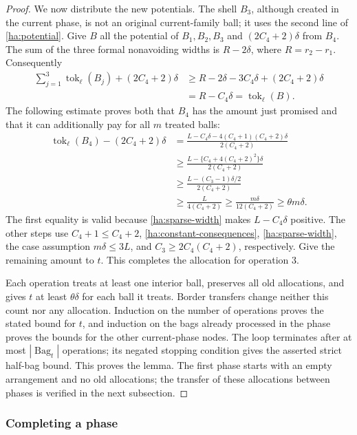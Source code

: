 \documentclass[11pt]{amsart}
\theoremstyle{definition}
\theoremstyle{remark}
\numberwithin{equation}{section}
\begin{document}
\begin{proof}
We now distribute the new potentials.  The shell $B_3$, although
created in the current phase, is not an original current-family ball;
it uses the second line of \eqref{ha:potential}.  Give $B$ all the
potential of $B_1,B_2,B_3$ and $(2C_4+2)\delta$ from $B_4$.
The sum of the three formal nonavoiding widths is $R-2\delta$,
where $R=r_2-r_1$.  Consequently
\begin{align*}
 \sum_{j=1}^3\operatorname{tok}_\ell(B_j)+(2C_4+2)\delta
 &\geq R-2\delta-3C_4\delta+(2C_4+2)\delta\\
 &=R-C_4\delta=\operatorname{tok}_\ell(B).
\end{align*}
The following estimate proves both that $B_4$ has the amount just
promised and that it can additionally pay for all $m$ treated balls:
\begin{align*}
 \operatorname{tok}_\ell(B_4)-(2C_4+2)\delta
 &=\frac{L-C_4\delta-4(C_4+1)(C_4+2)\delta}{2(C_4+2)}\\
 &\geq\frac{L-\{C_4+4(C_4+2)^2\}\delta}{2(C_4+2)}\\
 &\geq\frac{L-(C_3-1)\delta/2}{2(C_4+2)}\\
 &\geq\frac{L}{4(C_4+2)}
 \geq\frac{m\delta}{12(C_4+2)}
 \geq\theta m\delta.
\end{align*}
The first equality is valid because \eqref{ha:sparse-width} makes
$L-C_4\delta$ positive.  The other steps use
$C_4+1\leq C_4+2$, \eqref{ha:constant-consequences},
\eqref{ha:sparse-width}, the case assumption $m\delta\leq3L$, and
$C_3\geq2C_4(C_4+2)$, respectively.  Give the remaining amount to $t$.
This completes the allocation for operation 3.

Each operation treats at least one interior ball, preserves all old
allocations, and gives $t$ at least $\theta\delta$ for each ball it
treats.  Border transfers change neither this count nor any allocation.
Induction on the number of operations proves the stated bound for
$t$, and induction on the bags already processed in the phase proves
the bounds for the other current-phase nodes.  The loop terminates
after at most $|\operatorname{Bag}_t|$ operations; its negated stopping
condition gives the asserted strict half-bag bound.  This proves the
lemma.  The first phase starts with an empty arrangement and no old
allocations; the transfer of these allocations between phases is
verified in the next subsection.
\end{proof}

\subsubsection{Completing a phase}
\label{ha:postprocess}
\end{document}
